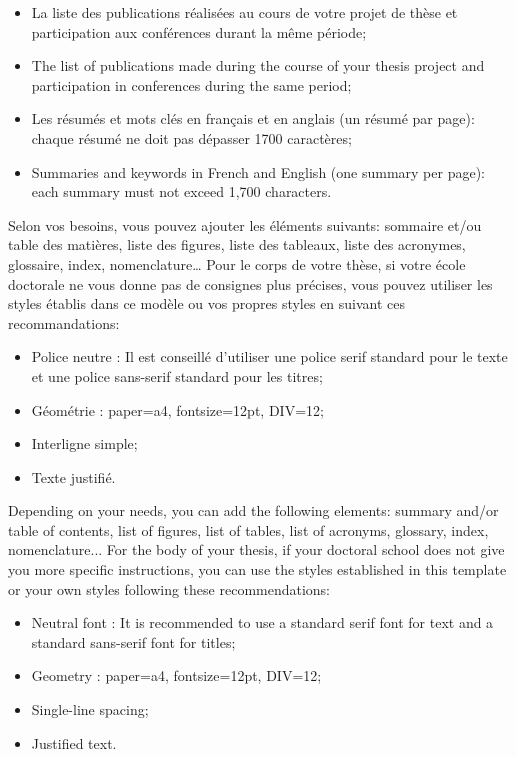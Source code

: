 \begin{itemize}
	\item La liste des publications réalisées au cours de votre projet de thèse et participation aux conférences durant la même période;
	\item The list of publications made during the course of your thesis project and participation in conferences during the same period;
	\\

	\item Les résumés et mots clés en français et en anglais (un résumé par page): chaque résumé ne doit pas dépasser 1700 caractères;
	\item Summaries and keywords in French and English (one summary per page): each summary must not exceed 1,700 characters.\\
\end{itemize}


Selon vos besoins, vous pouvez ajouter les éléments suivants: sommaire et/ou table des matières, liste des figures, liste des tableaux, liste des acronymes, glossaire, index, nomenclature…
Pour le corps de votre thèse, si votre école doctorale ne vous donne pas de consignes plus précises, vous pouvez utiliser les styles établis dans ce modèle ou vos propres styles en suivant ces recommandations:
\begin{itemize}
	\item Police neutre : Il est conseillé d'utiliser une police serif standard pour le texte et une police sans-serif standard pour les titres;
	\item Géométrie : paper=a4, fontsize=12pt, DIV=12;
	\item Interligne simple;
	\item Texte justifié.
\end{itemize}
Depending on your needs, you can add the following elements: summary and/or table of contents, list of figures, list of tables, list of acronyms, glossary, index, nomenclature...
For the body of your thesis, if your doctoral school does not give you more specific instructions, you can use the styles established in this template or your own styles following these recommendations:
\begin{itemize}
	\item Neutral font : It is recommended to use a standard serif font for text and a standard sans-serif font for titles;
	\item Geometry : paper=a4, fontsize=12pt, DIV=12;
	\item Single-line spacing;
	\item Justified text.\\
\end{itemize}

